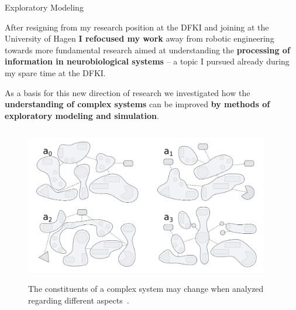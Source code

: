 


\begin{frame}{Exploratory Modeling }

\vspace{1em}
\justifying
After resigning from my research position at the DFKI and joining 
 at the University of Hagen 
{\bf I refocused my work} away from robotic engineering towards more fundamental 
research aimed at understanding the {\bf processing of information in 
neurobiological systems} -- a topic I pursued already during my spare time at 
the DFKI. 

\vspace{1.5em}
As a basis for this new direction of research we investigated how the 
{\bf understanding of complex systems} can be improved {\bf by methods of 
exploratory modeling and simulation}.


\begin{columns}[t]
\begin{column}{0.36\textwidth}
\begin{figure}
{
\includegraphics[width=\linewidth]{exploratory_modeling/aspects.jpg}
}

\vspace{-1.0em}
\caption{\justifying\scriptsize The constituents of a complex system may change
when analyzed regarding different aspects~\cite{Kerdels2012}.}
\end{figure}
\end{column}
\begin{column}{0.2\textwidth}


\end{column}
\end{columns}
\end{frame}
